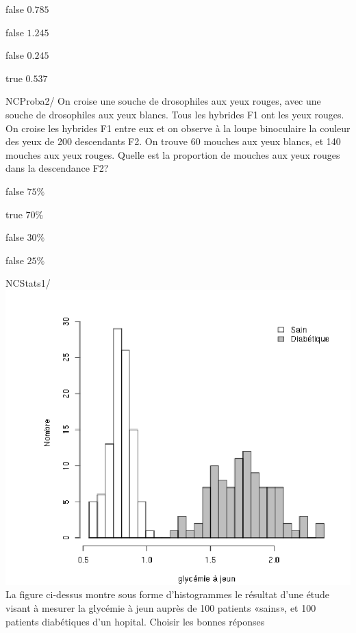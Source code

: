             \begin{reponses}
            	\item[false] $0.785$
            	\item[false] $1.245$
                \item[false] $0.245$
                \item[true]  $0.537$
            \end{reponses}
             \begin{question}{NC}{Proba}{2}{/} 
 				On croise une souche de drosophiles aux yeux rouges, avec une souche de drosophiles aux yeux blancs. Tous les hybrides F1 ont les yeux rouges. On croise les hybrides F1 entre eux et on observe à la loupe binoculaire la couleur des yeux de 200 descendants F2. On trouve 60 mouches aux yeux blancs, et 140 mouches aux yeux rouges. Quelle est la proportion de mouches aux yeux rouges dans la descendance F2?
            \end{question}
            \begin{reponses}
            	\item[false]  $75\%$
            	\item[true]   $70\%$
                \item[false]  $30\%$
                \item[false]  $25\%$
            \end{reponses}
			\begin{question}{NC}{Stats}{1}{/} 
			\includegraphics[width=\textwidth]{Christopher/Figures_Christopher/glycemie_UE.png}
				La figure ci-dessus montre sous forme d’histogrammes le résultat d’une étude visant à mesurer la glycémie à jeun auprès de 100 patients «sains», et 100 patients diabétiques d’un hopital. Choisir les bonnes réponses
            \end{question}

